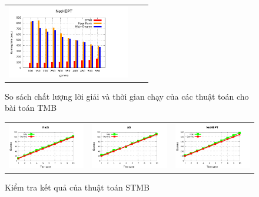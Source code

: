 \begin{figure}
\begin{tabular}{lll}
	\includegraphics[height = 3.2cm]{picture/TimeNetHEPT}
\end{tabular}
\caption{So sách chất lượng lời giải và thời gian chạy của các thuật toán cho bài toán TMB}
\label{solSTMB}    
\end{figure}
\begin{figure}[htp]
\begin{tabular}{ccc}
	\includegraphics[height = 3.2 cm]{picture/CheckNetS} &
	\includegraphics[height = 3.2 cm]{picture/CheckAS} &   
	\includegraphics[height = 3.2 cm]{picture/CheckNetHEPT}
\end{tabular}
\caption{Kiểm tra kết quả của thuật toán STMB}
\label{check}    
\end{figure}

